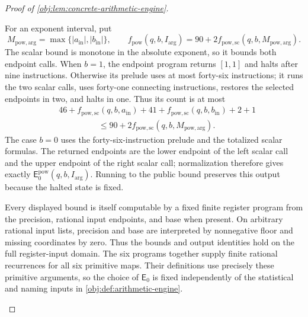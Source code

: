 \documentclass[11pt]{article}
\begin{document}
\begin{proof}[Proof of \cref{obj:lem:concrete-arithmetic-engine}]
\begin{enumerate}
For an exponent interval, put
\[
M_{\mathrm{pow},\mathrm{arg}}
 =\max\{|a_{\mathrm{in}}|,|b_{\mathrm{in}}|\},
\qquad
f_{\mathrm{pow}}(q,b,I_{\mathrm{arg}})
 =90+2f_{\mathrm{pow},\mathrm{sc}}
       (q,b,M_{\mathrm{pow},\mathrm{arg}}).
\]
The scalar bound is monotone in the absolute exponent, so it bounds both endpoint calls. When \(b=1\), the endpoint program returns \([1,1]\) and halts after nine instructions. Otherwise its prelude uses at most forty-six instructions; it runs the two scalar calls, uses forty-one connecting instructions, restores the selected endpoints in two, and halts in one. Thus its count is at most
\[
\begin{split}
&46+f_{\mathrm{pow},\mathrm{sc}}(q,b,a_{\mathrm{in}})
 +41+f_{\mathrm{pow},\mathrm{sc}}(q,b,b_{\mathrm{in}})+2+1\\
&\hspace{2cm}\le
90+2f_{\mathrm{pow},\mathrm{sc}}
       (q,b,M_{\mathrm{pow},\mathrm{arg}}).
\end{split}
\]
The case \(b=0\) uses the forty-six-instruction prelude and the totalized scalar formulas. The returned endpoints are the lower endpoint of the left scalar call and the upper endpoint of the right scalar call; normalization therefore gives exactly
\(\mathsf E_0^{\mathrm{pow}}(q,b,I_{\mathrm{arg}})\).
Running to the public bound preserves this output because the halted state is fixed.

Every displayed bound is itself computable by a fixed finite register program from the precision, rational input endpoints, and base when present. On arbitrary rational input lists, precision and base are interpreted by nonnegative floor and missing coordinates by zero. Thus the bounds and output identities hold on the full register-input domain. The six programs together supply finite rational recurrences for all six primitive maps. Their definitions use precisely these primitive arguments, so the choice of \(\mathsf E_0\) is fixed independently of the statistical and naming inputs in \cref{obj:def:arithmetic-engine}.


\end{enumerate}
\end{proof}
\end{document}
